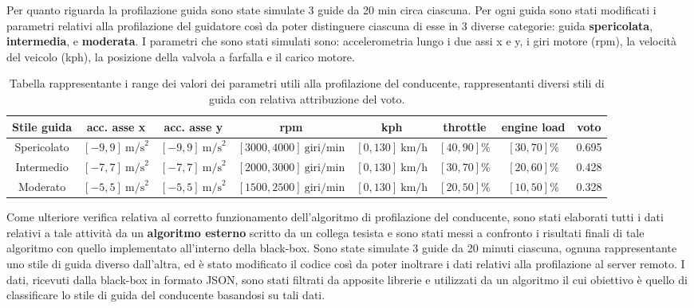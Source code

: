 \documentclass[12pt, a4paper, italian]{report}
\numberwithin{figure}{chapter}
\numberwithin{table}{chapter}
\begin{document}
Per quanto riguarda la profilazione guida sono state simulate 3 guide da 20 min circa ciascuna. Per ogni guida sono stati modificati i parametri relativi alla profilazione del guidatore così da poter distinguere ciascuna di esse in 3 diverse categorie: guida \textbf{spericolata}, \textbf{intermedia},  e \textbf{moderata}. I parametri che sono stati simulati sono: accelerometria lungo i due assi x e y, i giri motore (rpm), la velocità del veicolo (kph), la posizione della valvola a farfalla e il carico motore. 

\begin{table}[h!]
  \centering 
  \begin{adjustbox}{max width=\textwidth}
    \begin{tabular}{|c|c|c|c|c|c|c|c|}
      \hline
      \textbf{Stile guida} & \textbf{acc. asse x} & \textbf{acc. asse y} & \textbf{rpm} & \textbf{kph} & \textbf{throttle} & \textbf{engine load} & \textbf{voto} \\
      \hline
      Spericolato & $[-9,9] \ \text{m/s}^2$ & $[-9,9] \ \text{m/s}^2$ & $[3000,4000] \ \text{giri/min}$ & $[0,130] \ \text{km/h}$ & $[40,90] \%$ & $[30,70] \%$  & 0.695\\
      \hline
      Intermedio & $[-7,7] \ \text{m/s}^2$ & $[-7,7] \ \text{m/s}^2$ & $[2000,3000] \ \text{giri/min}$ & $[0,130] \ \text{km/h}$ & $[30,70] \%$ & $[20,60] \%$  & 0.428\\
      \hline
      Moderato & $[-5,5] \ \text{m/s}^2$ & $[-5,5] \ \text{m/s}^2$ & $[1500,2500] \ \text{giri/min}$ & $[0,130] \ \text{km/h}$ & $[20,50] \%$ & $[10,50] \%$  & 0.328\\
      \hline
    \end{tabular}
  \end{adjustbox}
  \caption{Tabella rappresentante i range dei valori dei parametri utili alla profilazione del conducente, rappresentanti diversi stili di guida con relativa attribuzione del voto.}
  \label{tab:stili_di_guida}
\end{table}

Come ulteriore verifica relativa al corretto funzionamento dell'algoritmo di profilazione del conducente, sono stati elaborati tutti i dati relativi a tale attività da un \textbf{algoritmo esterno} scritto da un collega tesista e sono stati messi a confronto i risultati finali di tale algoritmo con quello implementato all'interno della black-box. Sono state simulate 3 guide da 20 minuti ciascuna, ognuna rappresentante uno stile di guida diverso dall'altra, ed è stato modificato il codice così da poter inoltrare i dati relativi alla profilazione al server remoto. I dati, ricevuti dalla black-box in formato JSON, sono stati filtrati da apposite librerie e utilizzati da un algoritmo il cui obiettivo è quello di classificare lo stile di guida del conducente basandosi su tali dati.
\end{document}

